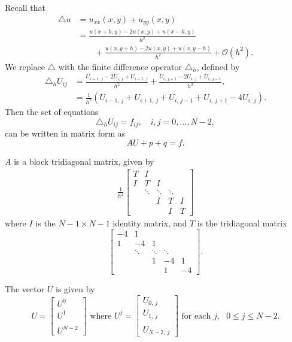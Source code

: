 Recall that 
 \begin{align*}
 \triangle u &= u_{xx}(x,y) + u_{yy}(x,y) \\
&= \frac{u(x+h,y) - 2u(x,y)+ u(x-h,y)}{h^2} \\
 & \qquad{}+ 
 \frac{u(x,y+h) - 2u(x,y)+ u(x,y-h)}{h^2} + \mathcal{O}(h^2).
 \end{align*}
 We replace $\triangle $ with the finite difference operator $\triangle_h$, defined by 
 \begin{align*}
 \triangle_h U_{ij} &= \frac{U_{i+1,\,j} - 2U_{i,\,j} + U_{i-1,\,j}}{h^2} + \frac{U_{i,\,j+1} - 2U_{i,\,j}+ U_{i,\,j-1}}{h^2},\\
&= \frac{1}{h^2}(U_{i-1,\,j} + U_{i+1,\,j} + U_{i,\,j-1} + U_{i,\,j+1}-4U_{i,\,j}).
 \end{align*}
 Then the set of equations  
\[
\triangle_h U_{ij} = f_{ij}, \quad i,j = 0,\ldots,N-2,
\]%
can be written in matrix form as
 \[AU + p +  q  = f.\]

$A$ is a block tridiagonal matrix, given by 
\begin{align}
	\frac{1}{h^2}
\begin{bmatrix}
T & I & &  &\\
I &T & I & &\\
&\ddots  & \ddots & \ddots & \\
&  & I & T & I \\
&  &  & I & T\end{bmatrix}\label{poisson2d:matrixA}
\end{align}
where $I$ is the $N-1\times N-1$ %
identity matrix, and $T$ is the tridiagonal matrix
\[\begin{bmatrix}
-4 & 1 & &  &\\
1 &-4 & 1 & &\\
&\ddots  & \ddots & \ddots & \\
&  & 1 & -4 & 1 \\
&  &  & 1 & -4 \end{bmatrix}.\]

The vector $U$ is given by 
\[U = \begin{bmatrix} U^0 \\ U^1 \\ \\ U^{N-2} \end{bmatrix} \text{ where } U^j = 
\begin{bmatrix} U_{0,\,j} \\ U_{1,\,j} \\ \\ U_{N-2,\,j} \end{bmatrix} \text{ for each } j, \text{ }0\leq j \leq N-2.\]

